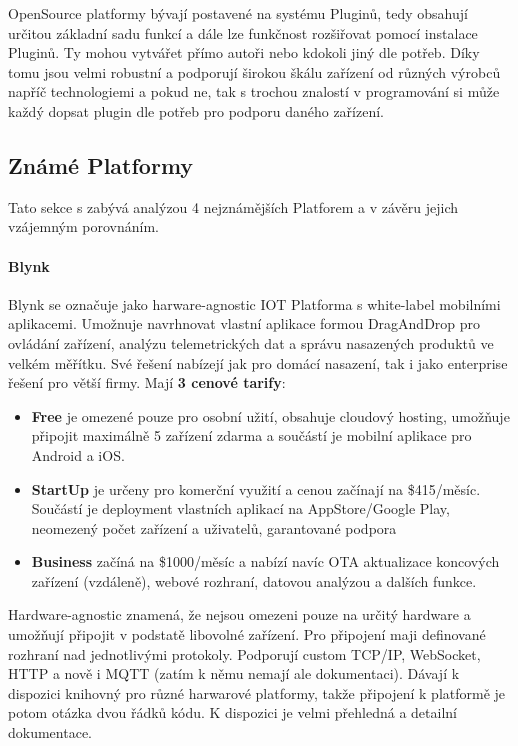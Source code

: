 \documentclass[thesis=B,czech]{FITthesis}[2019/12/23]
\begin{document}
OpenSource platformy bývají postavené na systému Pluginů, tedy obsahují určitou základní sadu funkcí a dále lze funkčnost rozšiřovat pomocí instalace Pluginů. Ty mohou vytvářet přímo autoři nebo kdokoli jiný dle potřeb. Díky tomu jsou velmi robustní a podporují širokou škálu zařízení od různých výrobců napříč technologiemi a pokud ne, tak s trochou znalostí v programování si může každý dopsat plugin dle potřeb pro podporu daného zařízení.


\subsection{Známé Platformy}  %
Tato sekce s zabývá analýzou 4 nejznámějších Platforem a v závěru jejich vzájemným porovnáním.

\paragraph{Blynk}
Blynk se označuje jako harware-agnostic IOT Platforma s white-label mobilními aplikacemi. Umožnuje navrhnovat vlastní aplikace formou DragAndDrop pro ovládání zařízení, analýzu telemetrických dat a správu nasazených produktů ve velkém měřítku. Své řešení nabízejí jak pro domácí nasazení, tak i jako enterprise řešení pro větší firmy. Mají \textbf{3 cenové tarify}:
\begin{itemize}
    \item \textbf{Free} je omezené pouze pro osobní užití, obsahuje cloudový hosting, umožňuje připojit maximálně 5 zařízení zdarma a součástí je mobilní aplikace pro Android a iOS.
    \item \textbf{StartUp} je určeny pro komerční využití a cenou začínají na \$415/měsíc. Součástí je deployment vlastních aplikací na AppStore/Google Play, neomezený počet zařízení a uživatelů, garantované podpora
    \item \textbf{Business} začíná na \$1000/měsíc a nabízí navíc OTA aktualizace koncových zařízení (vzdáleně), webové rozhraní, datovou analýzou a dalších funkce.
\end{itemize}

Hardware-agnostic znamená, že nejsou omezeni pouze na určitý hardware a umožňují připojit v podstatě libovolné zařízení. Pro připojení maji definované rozhraní nad jednotlivými protokoly. Podporují custom TCP/IP, WebSocket, HTTP a nově i MQTT (zatím k němu nemají ale dokumentaci). Dávají k dispozici knihovný pro různé harwarové platformy, takže připojení k platformě je potom otázka dvou řádků kódu. K dispozici je velmi přehledná a detailní dokumentace.
\end{document}

